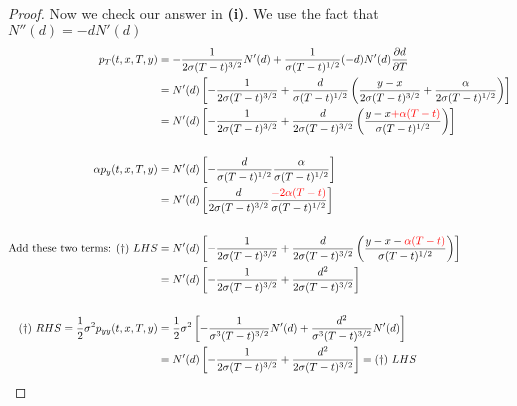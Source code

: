 \documentclass[a4paper, 10pt]{article}
\theoremstyle{definition}
\theoremstyle{hSol}
\begin{document}
\begin{proof}
 Now we check our answer in \textbf{(i)}. We use the fact that $N''(d) = -dN'(d)$
 \begin{equation}
   \begin{split}
     p_T(t,x,T,y) &= -\frac{1}{2\sigma (T-t)^{3/2}} N'(d) + \frac{1}{\sigma (T-t)^{1/2}}(-d)N'(d) \frac{\partial d}{\partial T} \\
     &= N'(d) \left[ -\frac{1}{2\sigma (T-t)^{3/2}} + \frac{d}{\sigma (T-t)^{1/2}}\left(\frac{y-x}{2\sigma (T-t)^{3/2}}+\frac{\alpha}{2\sigma(T-t)^{1/2}}\right)\right]\\
     &= N'(d) \left[ -\frac{1}{2\sigma (T-t)^{3/2}} + \frac{d}{2\sigma (T-t)^{3/2}}\left(\frac{y-x\textcolor{red}{+\alpha(T-t)}}{\sigma (T-t)^{1/2}}\right)\right]\\
     &\\
     \alpha p_y(t,x,T,y) &= N'(d)\left[-\frac{d}{\sigma(T-t)^{1/2}} \frac{\alpha}{\sigma(T-t)^{1/2}}\right]\\
     &= N'(d)\left[\frac{d}{2\sigma(T-t)^{3/2}} \frac{\textcolor{red}{-2\alpha(T-t)}}{\sigma(T-t)^{1/2}}\right]\\
     &\\
     \text{Add these two terms: }(\dag)~LHS &= N'(d) \left[ -\frac{1}{2\sigma (T-t)^{3/2}} + \frac{d}{2\sigma (T-t)^{3/2}}\left(\frac{y-x-\textcolor{red}{\alpha(T-t)}}{\sigma (T-t)^{1/2}}\right)\right]\\
     &=N'(d) \left[ -\frac{1}{2\sigma (T-t)^{3/2}} + \frac{d^2}{2\sigma (T-t)^{3/2}}\right]\\
     &\\
     (\dag)~RHS = \frac{1}{2}\sigma^2 p_{yy}(t,x,T,y) &= \frac{1}{2}\sigma^2\left[-\frac{1}{\sigma^3(T-t)^{3/2}}N'(d)+\frac{d^2}{\sigma^3 (T-t)^{3/2}}N'(d)\right] \\
     &=N'(d) \left[ -\frac{1}{2\sigma (T-t)^{3/2}} + \frac{d^2}{2\sigma (T-t)^{3/2}}\right] = (\dag)~LHS\\ 
   \end{split}
 \end{equation}
\end{proof}
\end{document}
